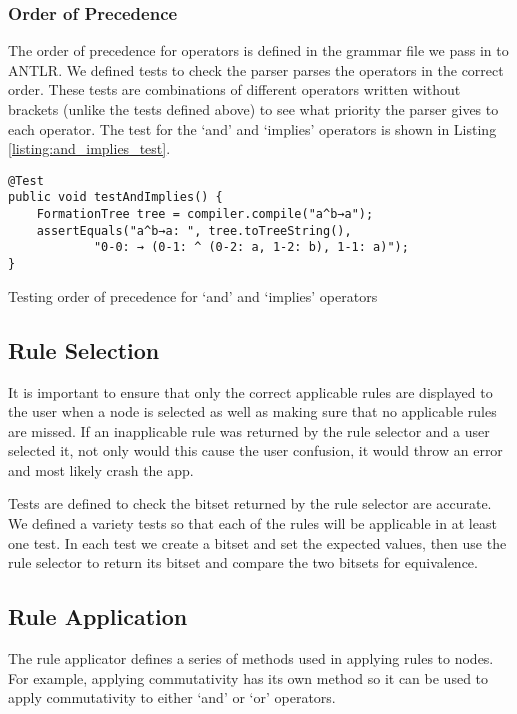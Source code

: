 \documentclass{report}
\begin{document}
\subsubsection{Order of Precedence}

The order of precedence for operators is defined in the grammar file we pass in to ANTLR. We defined tests to check the parser parses the operators in the correct order. These tests are combinations of different operators written without brackets (unlike the tests defined above) to see what priority the parser gives to each operator. The test for the `and' and `implies' operators is shown in Listing \ref{listing:and_implies_test}.

\begin{listing}[ht]
\begin{verbatim}
@Test
public void testAndImplies() {
    FormationTree tree = compiler.compile("a^b→a");
    assertEquals("a^b→a: ", tree.toTreeString(), 
            "0-0: → (0-1: ^ (0-2: a, 1-2: b), 1-1: a)");
}
\end{verbatim}
\caption{Testing order of precedence for `and' and `implies' operators}
\label{listing:and_implies_test}
\end{listing}

\subsection{Rule Selection}

It is important to ensure that only the correct applicable rules are displayed to the user when a node is selected as well as making sure that no applicable rules are missed. If an inapplicable rule was returned by the rule selector and a user selected it, not only would this cause the user confusion, it would throw an error and most likely crash the app.

Tests are defined to check the bitset returned by the rule selector are accurate. We defined a variety tests so that each of the rules will be applicable in at least one test. In each test we create a bitset and set the expected values, then use the rule selector to return its bitset and compare the two bitsets for equivalence.

\subsection{Rule Application}

The rule applicator defines a series of methods used in applying rules to nodes. For example, applying commutativity has its own method so it can be used to apply commutativity to either `and' or `or' operators.
\end{document}
